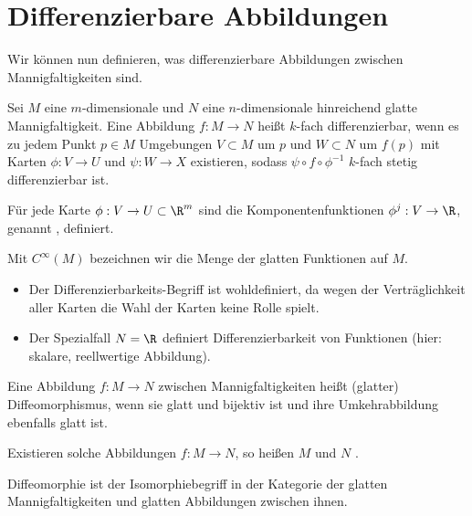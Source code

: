 \chapter{Differenzierbare Abbildungen}


Wir können nun definieren, was differenzierbare Abbildungen zwischen Mannigfaltigkeiten sind.

\begin{df} \label{2.1}
    Sei $M$ eine $m$-dimensionale und $N$ eine $n$-dimensionale hinreichend glatte Mannigfaltigkeit.    
    Eine Abbildung $f: M \to N$ heißt $k$-fach differenzierbar, wenn es zu jedem Punkt $p \in M$ Umgebungen $V \subset M$ um $p$ und $W \subset N$ um $f(p)$ mit Karten $\phi: V \to U$ und $\psi: W \to X$ existieren, sodass
    \begin{math}
        \psi \circ f \circ \phi^{-1}
    \end{math}
    $k$-fach stetig differenzierbar ist.

    Für jede Karte $\phi: V \to U \subset \R^m$ sind die Komponentenfunktionen $\phi^j: V \to \R$, genannt , definiert.
    
    Mit $C^\infty(M)$ bezeichnen wir die Menge der glatten Funktionen auf $M$.
    \begin{note}
        \begin{itemize}
            \item
                Der Differenzierbarkeits-Begriff ist wohldefiniert, da wegen der Verträglichkeit aller Karten die Wahl der Karten keine Rolle spielt.
            \item
                Der Spezialfall $N = \R$ definiert Differenzierbarkeit von Funktionen (hier: skalare, reellwertige Abbildung).
        \end{itemize}
    \end{note}
\end{df}

\begin{df} \label{2.2}
    Eine Abbildung $f: M \to N$ zwischen Mannigfaltigkeiten heißt (glatter) Diffeomorphismus, wenn sie glatt und bijektiv ist und ihre Umkehrabbildung ebenfalls glatt ist.

    Existieren solche Abbildungen $f: M \to N$, so heißen $M$ und $N$ .
    \begin{note}
        Diffeomorphie ist der Isomorphiebegriff in der Kategorie der glatten Mannigfaltigkeiten und glatten Abbildungen zwischen ihnen.
    \end{note}
\end{df}

